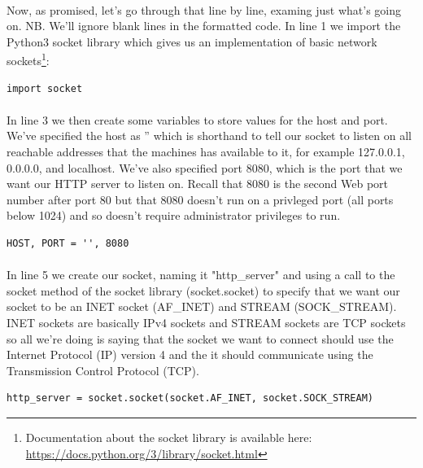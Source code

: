 \paragraph{} Now, as promised, let's go through that line by line, examing just what's going on. NB. We'll ignore blank lines in the formatted code. In line 1 we import the Python3 socket library which gives us an implementation of basic network sockets\footnote{Documentation about the socket library is available here: \url{https://docs.python.org/3/library/socket.html}}:

\begin{lstlisting}[style=CODE]
import socket
\end{lstlisting}

\paragraph{} In line 3 we then create some variables to store values for the host and port. We've specified the host as '' which is shorthand to tell our socket to listen on all reachable addresses that the machines has available to it, for example 127.0.0.1, 0.0.0.0, and localhost. We've also specified port 8080, which is the port that we want our HTTP server to listen on. Recall that 8080 is the second Web port number after port 80 but that 8080 doesn't run on a privleged port (all ports below 1024) and so doesn't require administrator privileges to run.

\begin{lstlisting}[style=CODE]
HOST, PORT = '', 8080
\end{lstlisting}

\paragraph{} In line 5 we create our socket, naming it "http\_server" and using a call to the socket method of the socket library (socket.socket) to specify that we want our socket to be an INET socket (AF\_INET) and STREAM (SOCK\_STREAM). INET sockets are basically IPv4 sockets and STREAM sockets are TCP sockets so all we're doing is saying that the socket we want to connect should use the Internet Protocol (IP) version 4 and the it should communicate using the Transmission Control Protocol (TCP).

\begin{lstlisting}[style=CODE]
http_server = socket.socket(socket.AF_INET, socket.SOCK_STREAM)
\end{lstlisting}

